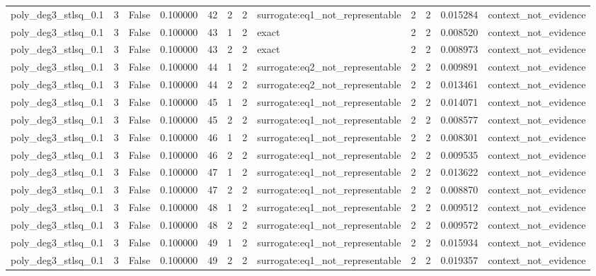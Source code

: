 \begin{tabular}{lrrrrrrlrrrl}
poly\_deg3\_stlsq\_0.1 & 3 & False & 0.100000 & 42 & 2 & 2 & surrogate:eq1\_not\_representable & 2 & 2 & 0.015284 & context\_not\_evidence \\
poly\_deg3\_stlsq\_0.1 & 3 & False & 0.100000 & 43 & 1 & 2 & exact & 2 & 2 & 0.008520 & context\_not\_evidence \\
poly\_deg3\_stlsq\_0.1 & 3 & False & 0.100000 & 43 & 2 & 2 & exact & 2 & 2 & 0.008973 & context\_not\_evidence \\
poly\_deg3\_stlsq\_0.1 & 3 & False & 0.100000 & 44 & 1 & 2 & surrogate:eq2\_not\_representable & 2 & 2 & 0.009891 & context\_not\_evidence \\
poly\_deg3\_stlsq\_0.1 & 3 & False & 0.100000 & 44 & 2 & 2 & surrogate:eq2\_not\_representable & 2 & 2 & 0.013461 & context\_not\_evidence \\
poly\_deg3\_stlsq\_0.1 & 3 & False & 0.100000 & 45 & 1 & 2 & surrogate:eq1\_not\_representable & 2 & 2 & 0.014071 & context\_not\_evidence \\
poly\_deg3\_stlsq\_0.1 & 3 & False & 0.100000 & 45 & 2 & 2 & surrogate:eq1\_not\_representable & 2 & 2 & 0.008577 & context\_not\_evidence \\
poly\_deg3\_stlsq\_0.1 & 3 & False & 0.100000 & 46 & 1 & 2 & surrogate:eq1\_not\_representable & 2 & 2 & 0.008301 & context\_not\_evidence \\
poly\_deg3\_stlsq\_0.1 & 3 & False & 0.100000 & 46 & 2 & 2 & surrogate:eq1\_not\_representable & 2 & 2 & 0.009535 & context\_not\_evidence \\
poly\_deg3\_stlsq\_0.1 & 3 & False & 0.100000 & 47 & 1 & 2 & surrogate:eq1\_not\_representable & 2 & 2 & 0.013622 & context\_not\_evidence \\
poly\_deg3\_stlsq\_0.1 & 3 & False & 0.100000 & 47 & 2 & 2 & surrogate:eq1\_not\_representable & 2 & 2 & 0.008870 & context\_not\_evidence \\
poly\_deg3\_stlsq\_0.1 & 3 & False & 0.100000 & 48 & 1 & 2 & surrogate:eq1\_not\_representable & 2 & 2 & 0.009512 & context\_not\_evidence \\
poly\_deg3\_stlsq\_0.1 & 3 & False & 0.100000 & 48 & 2 & 2 & surrogate:eq1\_not\_representable & 2 & 2 & 0.009572 & context\_not\_evidence \\
poly\_deg3\_stlsq\_0.1 & 3 & False & 0.100000 & 49 & 1 & 2 & surrogate:eq1\_not\_representable & 2 & 2 & 0.015934 & context\_not\_evidence \\
poly\_deg3\_stlsq\_0.1 & 3 & False & 0.100000 & 49 & 2 & 2 & surrogate:eq1\_not\_representable & 2 & 2 & 0.019357 & context\_not\_evidence \\

\end{tabular}
